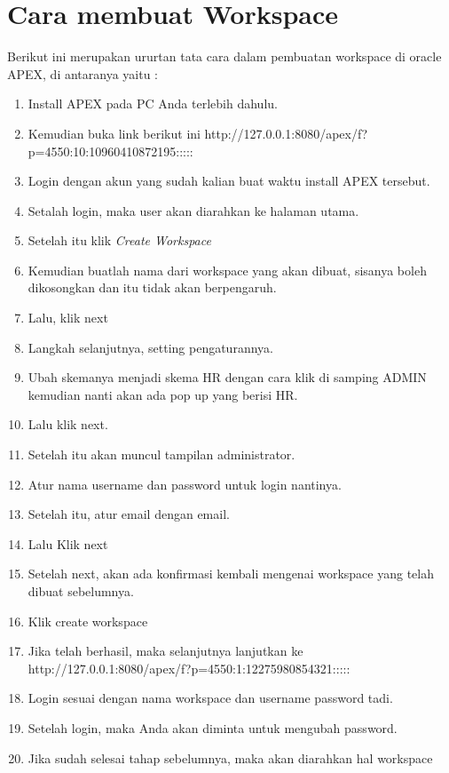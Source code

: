 \section{Cara membuat Workspace}
Berikut ini merupakan ururtan tata cara dalam pembuatan workspace di oracle APEX, di antaranya yaitu :\\ 
\begin{enumerate}
    \item Install APEX pada PC Anda terlebih dahulu.
    \item Kemudian buka link berikut ini http://127.0.0.1:8080/apex/f?p=4550:10:10960410872195:::::
    \item Login dengan akun yang sudah kalian buat waktu install APEX tersebut.
    \item Setalah login, maka user akan diarahkan ke halaman utama.
    \item Setelah itu klik \textit{Create Workspace}
    \item Kemudian buatlah nama dari workspace yang akan dibuat, sisanya boleh dikosongkan dan itu tidak akan berpengaruh.
    \item Lalu, klik next
    \item Langkah selanjutnya, setting pengaturannya.
    \item Ubah skemanya menjadi skema HR dengan cara klik di samping ADMIN kemudian nanti akan ada pop up yang berisi HR.
    \item Lalu klik next.
    \item Setelah itu akan muncul tampilan administrator.
    \item Atur nama username dan password untuk login nantinya.
    \item Setelah itu, atur email dengan email. 
    \item Lalu Klik next
    \item Setelah next, akan ada konfirmasi kembali mengenai workspace yang telah dibuat sebelumnya.
    \item Klik create workspace
    \item Jika telah berhasil, maka selanjutnya lanjutkan ke http://127.0.0.1:8080/apex/f?p=4550:1:12275980854321:::::
    \item Login sesuai dengan nama workspace dan username password tadi.
    \item Setelah login, maka Anda akan diminta untuk mengubah password.
    \item Jika sudah selesai tahap sebelumnya, maka akan diarahkan hal workspace
\end{enumerate}

